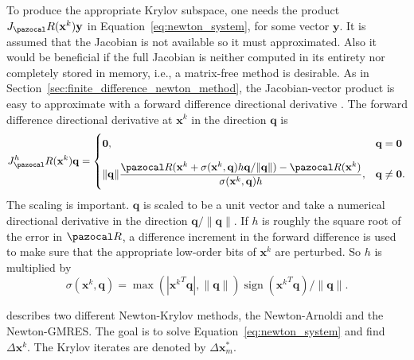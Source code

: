 To produce the appropriate Krylov subspace, one needs the product \(J_\pazocal R(\mathbf x^k) \mathbf y\) in Equation~\eqref{eq:newton_system}, for some vector \(\mathbf y\).
It is assumed that the Jacobian is not available so it must approximated.
Also it would be beneficial if the full Jacobian is neither computed in its entirety nor completely stored in memory, i.e., a matrix-free method is desirable.
As in Section~\ref{sec:finite_difference_newton_method}, the Jacobian-vector product is easy to approximate with a forward difference directional derivative \citep{kelley_solving_2003}.
The forward difference directional derivative at \(\mathbf x^k\) in the direction \(\mathbf q\) is
\begin{equation}
  J^h_\pazocal R(\mathbf x^k)\mathbf q =
\begin{cases}
  \mathbf 0, & \mathbf q = \mathbf 0 \\[10pt]
  \|\mathbf q\| \displaystyle\frac{\pazocal R(\mathbf x^k+\sigma(\mathbf x^k, \mathbf q) h \mathbf q /\|\mathbf q\|)-\pazocal R(\mathbf x^k)}{\sigma(\mathbf x^k, \mathbf q) h}, & \mathbf q \neq \mathbf 0 .
  \end{cases}
\end{equation}
The scaling is important.
\(\mathbf q\) is scaled to be a unit vector and take a numerical directional derivative in the direction \(\mathbf q /\|\mathbf q\|\).
If \(h\) is roughly the square root of the error in \(\pazocal R\), a difference increment in the forward difference is used to make sure that the appropriate low-order bits of \(\mathbf x^k\) are perturbed.
So \(h\) is multiplied by
\begin{equation}
  \sigma(\mathbf x^k, \mathbf q)=\max (|{\mathbf x^k}^{T} \mathbf q|,\|\mathbf q\|) \operatorname{sign}({\mathbf x^k}^{T} \mathbf q) /\|\mathbf q\| .
\end{equation}

\cite{sidi_vector_2017} describes two different Newton-Krylov methods, the Newton-Arnoldi and the Newton-GMRES.
The goal is to solve Equation~\eqref{eq:newton_system} and find \(\Delta \mathbf x^k\).
The Krylov iterates are denoted by \(\Delta \mathbf x^*_m\).

